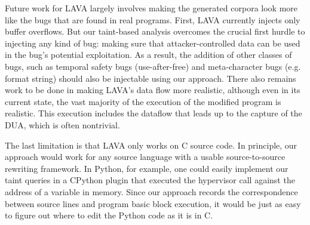 Future work for LAVA largely involves making the generated corpora look more like the bugs that are found in real programs. 
First, LAVA currently injects only buffer overflows. 
But our taint-based analysis overcomes the crucial first hurdle to injecting any kind of bug: making sure that attacker-controlled data can be used in the bug's potential exploitation. 
As a result, the addition of other classes of bugs, such as temporal safety bugs (use-after-free) and meta-character bugs (e.g. format string) should also be injectable using our approach. 
There also remains work to be done in making LAVA's data flow more realistic, although even in its current state, the vast majority of the execution of the modified program is realistic. 
This execution includes the dataflow that leads up to the capture of the DUA, which is often nontrivial.

The last limitation is that LAVA only works on C source code. 
In principle, our approach would work for any source language with a usable source-to-source rewriting framework. 
In Python, for example, one could easily implement our taint queries in a CPython plugin that executed the hypervisor call against the address of a variable in memory. 
Since our approach records the correspondence between source lines and program basic block execution, it would be just as easy to figure out where to edit the Python code as it is in C.
